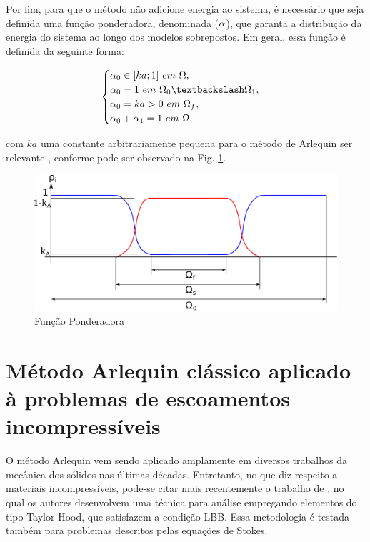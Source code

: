 \documentclass[tese_patricia]{subfiles}
\begin{document}
Por fim, para que o método não adicione energia ao sistema, é necessário que seja definida uma função ponderadora, denominada ($\alpha$), que garanta a distribução da energia do sistema ao longo dos modelos sobrepostos. Em geral, essa função é definida da seguinte forma:


\begin{align}
	\begin{cases} \arlequinWF_{0} \in [ka;1] \ em \ \Omega, \\ 
	\arlequinWF_{0} = 1 \ em \ \Omega_{0} \textbackslash \Omega_{1},  \\
	\arlequinWF_{0}  = ka > 0 \ em \ \Omega_{f}, \\
	\arlequinWFGlobal + \arlequinWFLocal = 1 \ em \ \Omega,
	\end{cases} \label{eq:alphai}
\end{align}

\noindent com $ka$ uma constante arbitrariamente pequena para o método de Arlequin ser relevante \cite{Dhia:2008}, conforme pode ser observado na Fig. \ref{fig:constanteKa}.


\begin{figure}[htb!]
	\centering 
	\includegraphics[scale=0.6,trim=0cm 0cm 0cm 0.0cm, clip=true]{Imagens/Cap6/ponderadora.pdf}	
	\caption{Função Ponderadora}
	\label{fig:constanteKa}
\end{figure}


\section{Método Arlequin clássico aplicado à problemas de escoamentos incompressíveis}

O método Arlequin vem sendo aplicado amplamente em diversos trabalhos da mecânica dos sólidos nas últimas décadas. Entretanto, no que diz respeito a materiais incompressíveis, pode-se citar mais recentemente o trabalho de , no qual os autores desenvolvem uma técnica para análise empregando elementos do tipo Taylor-Hood, que satisfazem a condição LBB. Essa metodologia é testada também para problemas descritos pelas equações de Stokes.
\end{document}
